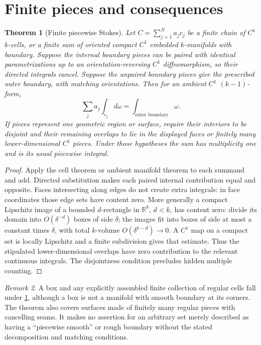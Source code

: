 \documentclass[11pt,oneside,openany]{book}
\newtheorem{theorem}{Theorem}[chapter]
\theoremstyle{definition}
\theoremstyle{remark}
\newtheorem{remark}[theorem]{Remark}
\newcommand{\R}{\mathbb R}
\newcommand{\family}[1]{}
\begin{document}
\section{Finite pieces and consequences}
\family{K04.15.08}\family{K04.15.09}
\begin{theorem}[Finite piecewise Stokes]\label{d04:15:piecewise}
Let $C=\sum_{j=1}^N a_jc_j$ be a finite chain of $C^1$ $k$-cells, or a
finite sum of oriented compact $C^1$ embedded $k$-manifolds with boundary.
Suppose the internal boundary pieces can be paired with identical
parametrizations up to an orientation-reversing $C^1$ diffeomorphism,
so their directed integrals cancel. Suppose the unpaired boundary pieces
give the prescribed outer boundary, with matching orientations. Then for
an ambient $C^1$ $(k-1)$-form,
\[
 \sum_j a_j\int_{c_j}d\omega=\int_{\text{outer boundary}}\omega.
\]
If pieces represent one geometric region or surface, require their interiors
to be disjoint and their remaining overlaps to lie in the displayed faces
or finitely many lower-dimensional $C^1$ pieces. Under those hypotheses the
sum has multiplicity one and is its usual piecewise integral.
\end{theorem}
\begin{proof}
Apply the cell theorem or ambient manifold theorem to each summand and add.
Directed substitution makes each paired internal contribution equal and
opposite. Faces intersecting along edges do not create extra integrals:
in face coordinates those edge sets have content zero. More generally a
compact Lipschitz image of a bounded $d$-rectangle in $\R^k$, $d<k$, has
content zero: divide its domain into $O(\delta^{-d})$ boxes of side
$\delta$; the images fit into boxes of side at most a constant times
$\delta$, with total $k$-volume $O(\delta^{k-d})\to0$.
A $C^1$ map on a compact set is locally Lipschitz and a finite subdivision
gives that estimate. Thus the stipulated lower-dimensional overlaps have
zero contribution to the relevant continuous integrals. The disjointness
condition precludes hidden multiple counting.
\end{proof}

\begin{remark}\label{d04:15:corners-scope}
A box and any explicitly assembled finite collection of regular cells fall
under \cref{d04:15:piecewise}, although a box is not a manifold with smooth
boundary at its corners. The theorem also covers surfaces made of finitely
many regular pieces with cancelling seams. It makes no assertion for an
arbitrary set merely described as having a ``piecewise smooth'' or rough
boundary without the stated decomposition and matching conditions.
\end{remark}
\end{document}
